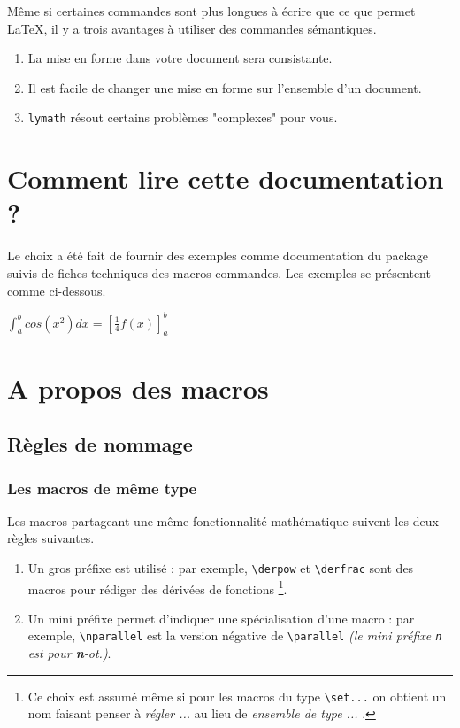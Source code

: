 \documentclass[12pt,a4paper]{article}
\newcommand\env[1]{\texttt{#1}}
\newcommand\macro[1]{\env{\textbackslash{}#1}}
\theoremstyle{definition}
\begin{document}
Même si certaines commandes sont plus longues à écrire que ce que permet \LaTeX{}, il y a trois avantages à utiliser des commandes sémantiques.
\begin{enumerate}
	\item La mise en forme dans votre document sera consistante.

	\item Il est facile de changer une mise en forme sur l'ensemble d'un document.

	\item \verb+lymath+ résout certains problèmes "complexes" pour vous.
\end{enumerate}




\section{Comment lire cette documentation ?}

Le choix a été fait de fournir des exemples comme documentation du package suivis de fiches techniques des macros-commandes. Les exemples se présentent comme ci-dessous.

\begin{latexex}
$\displaystyle \int_a^b cos(x^2) dx
 = \left[ \frac{1}{4} f(x) \right]_a^b$
\end{latexex}




\section{A propos des macros}

\subsection{Règles de nommage}

\subsubsection{Les macros de même \og type \fg}

Les macros partageant une même fonctionnalité mathématique suivent les deux règles suivantes.
\begin{enumerate}
	\item Un gros préfixe est utilisé : 
	      par exemple, \macro{derpow} et \macro{derfrac} sont des macros pour rédiger des dérivées de fonctions
	      \footnote{
	      	Ce choix est assumé même si pour les macros du type \macro{set...} on obtient un nom faisant penser à \emph{\og régler ... \fg} au lieu de \emph{\og ensemble de type ... \fg}.
		  }.

	\item Un mini préfixe permet d'indiquer une spécialisation d'une macro : 
	      par exemple, \macro{nparallel} est la version négative de \macro{parallel} \emph{(le mini préfixe \texttt{n} est pour \textbf{n}-ot.)}.
\end{enumerate}
\end{document}
